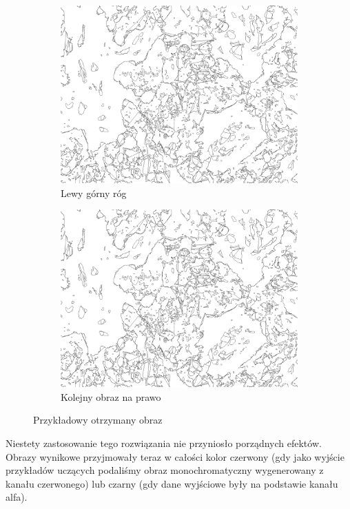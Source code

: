 \documentclass{article}
\begin{document}
\begin{figure}[H]
    \centering
    \begin{subfigure}{0.4\linewidth}
        \includegraphics[width=\linewidth]{images/output.jpg}
        \caption{Lewy górny róg}
    \end{subfigure}
    \begin{subfigure}{0.4\linewidth}
        \includegraphics[width=\linewidth]{images/output.jpg}
        \caption{Kolejny obraz na prawo}
    \end{subfigure}
    \caption{Przykładowy otrzymany obraz}
    \label{fig:input_split}
\end{figure}

Niestety zastosowanie tego rozwiązania nie przyniosło porządnych efektów.
Obrazy wynikowe przyjmowały teraz w całości kolor czerwony (gdy jako wyjście przykładów uczących podaliśmy obraz monochromatyczny wygenerowany z kanału czerwonego) lub
czarny (gdy dane wyjściowe były na podstawie kanału alfa).
\end{document}
